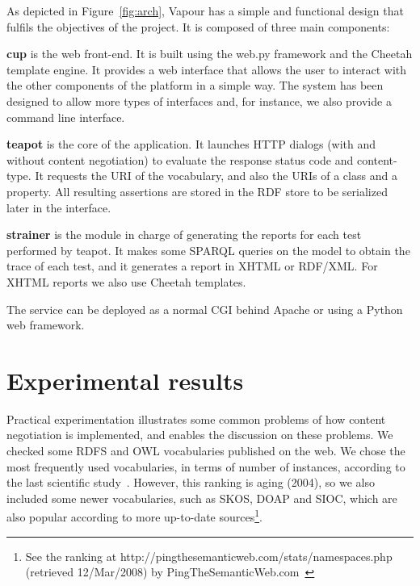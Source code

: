 \documentclass{../templates/llncs}
\begin{document}
As depicted in Figure~\ref{fig:arch}, Vapour has a simple and functional
design that fulfils the objectives of the project. It is composed of three
main components:

\begin{description}

  \item \textbf{cup} is the web front-end. It is built using the web.py framework
        and the Cheetah template engine. It provides a web interface that allows 
        the user to interact with the other components of the platform in a 
        simple way. The system has been designed to allow more types 
        of interfaces and, for instance, we also provide a command line interface.

  \item \textbf{teapot} is the core of the application. It launches
        HTTP dialogs 
        (with and without content negotiation) to evaluate the response
        status code and content-type. It requests the URI of the vocabulary, and 
        also the URIs of a class and a property. All resulting assertions are 
        stored in the RDF store to be serialized later in the interface.

  \item \textbf{strainer} is the module in charge of generating the reports for
        each test performed by teapot. It makes some SPARQL %
        queries on the model to obtain the trace of each test, and it generates 
        a report in XHTML or RDF/XML. For XHTML reports we also use Cheetah 
        templates.

\end{description}

The service can be deployed as a normal CGI behind Apache or using a Python web 
framework. %

\section{\label{sec:experimental}Experimental results}

Practical experimentation illustrates some common problems of how
content negotiation is implemented, and enables the discussion on 
these problems. We checked some RDFS and OWL vocabularies published on the web.
We chose the most frequently used vocabularies, in terms of number of
instances, according to the last scientific study~\cite{Li2005}. However,
this ranking is aging (2004), so we also included some newer
vocabularies, such as SKOS, DOAP and SIOC, which are also popular
according to more up-to-date sources\footnote{See the ranking at http://pingthesemanticweb.com/stats/namespaces.php (retrieved 12/Mar/2008) by PingTheSemanticWeb.com~\cite{Bojars2007}}.
\end{document}
